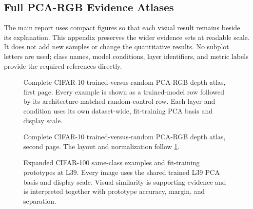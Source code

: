 \begin{landscape}
\section{Full PCA-RGB Evidence Atlases}
\label{sec:pca-rgb-appendix}

The main report uses compact figures so that each visual result remains beside
its explanation. This appendix preserves the wider evidence sets at readable
scale. It does not add new samples or change the quantitative results. No
subplot letters are used; class names, model conditions, layer identifiers, and
metric labels provide the required references directly.

\begin{figure}[!htbp]
    \centering
    \caption{Complete CIFAR-10 trained-versus-random PCA-RGB depth atlas,
    first page. Every example is shown as a trained-model row followed by its
    architecture-matched random-control row. Each layer and condition uses its
    own dataset-wide, fit-training PCA basis and display scale.}
    \label{fig:pca-cifar10-depth-appendix-1}
\end{figure}
\end{landscape}

\clearpage
\begin{landscape}
\begin{figure}[p]
    \centering
    \caption{Complete CIFAR-10 trained-versus-random PCA-RGB depth atlas,
    second page. The layout and normalization follow
    \cref{fig:pca-cifar10-depth-appendix-1}.}
    \label{fig:pca-cifar10-depth-appendix-2}
\end{figure}
\end{landscape}

\clearpage
\begin{landscape}
\begin{figure}[p]
    \centering
    \caption{Expanded CIFAR-100 same-class examples and fit-training
    prototypes at L39. Every image uses the shared trained L39 PCA basis and
    display scale. Visual similarity is supporting evidence and is interpreted
    together with prototype accuracy, margin, and separation.}
    \label{fig:pca-cifar100-prototypes-appendix}
\end{figure}
\end{landscape}

